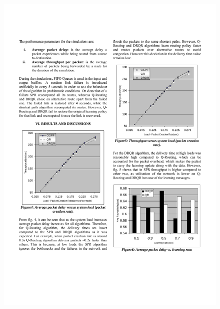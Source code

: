 \documentclass{standalone}
\begin{document}
\begin{figure}[H]
    \centering
    \includegraphics[width=14.5cm]{pic/translate/page-4.pdf}

\end{figure}
\end{document}
